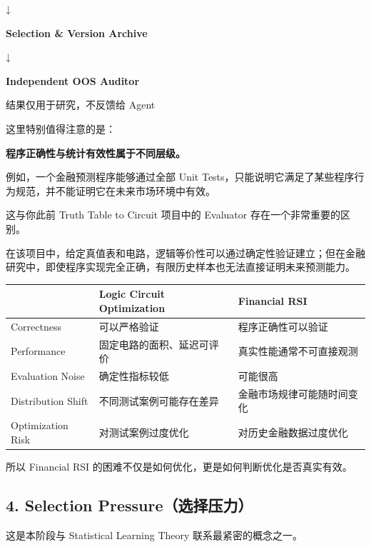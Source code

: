 ↓

\textbf{Selection \& Version Archive}

↓

\textbf{Independent OOS Auditor}

结果仅用于研究，不反馈给 Agent

这里特别值得注意的是：

\textbf{程序正确性与统计有效性属于不同层级。}

例如，一个金融预测程序能够通过全部 Unit Tests，只能说明它满足了某些程序行为规范，并不能证明它在未来市场环境中有效。

这与你此前 Truth Table to Circuit 项目中的 Evaluator 存在一个非常重要的区别。

在该项目中，给定真值表和电路，逻辑等价性可以通过确定性验证建立；但在金融研究中，即使程序实现完全正确，有限历史样本也无法直接证明未来预测能力。

\begin{readertable}
\begin{longtable}[]{@{}
  >{\raggedright\arraybackslash}p{}
  >{\raggedright\arraybackslash}p{}
  >{\raggedright\arraybackslash}p{}@{}}
\toprule
& Logic Circuit Optimization & Financial RSI \\
\midrule
\endhead
Correctness & 可以严格验证 & 程序正确性可以验证 \\
Performance & 固定电路的面积、延迟可评价 & 真实性能通常不可直接观测 \\
Evaluation Noise & 确定性指标较低 & 可能很高 \\
Distribution Shift & 不同测试案例可能存在差异 & 金融市场规律可能随时间变化 \\
Optimization Risk & 对测试案例过度优化 & 对历史金融数据过度优化 \\
\bottomrule
\end{longtable}
\end{readertable}

所以 Financial RSI 的困难不仅是如何优化，更是如何判断优化是否真实有效。

\hypertarget{part-3-40-0001-selection-pressureux9009ux62e9ux538bux529b}{%
\subsection{4. Selection Pressure（选择压力）}\label{part-3-40-0001-selection-pressureux9009ux62e9ux538bux529b}}

这是本阶段与 Statistical Learning Theory 联系最紧密的概念之一。

